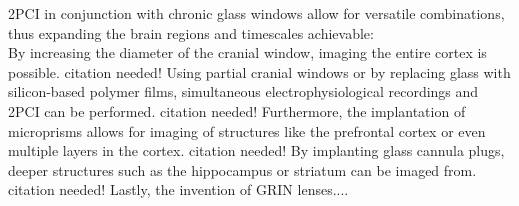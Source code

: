 2PCI in conjunction with chronic glass windows allow for versatile combinations, thus expanding the brain regions and timescales achievable:\\
By increasing the diameter of the cranial window, imaging the entire cortex is possible. citation needed! Using partial cranial windows or by replacing glass with silicon-based polymer films, simultaneous electrophysiological recordings and 2PCI can be performed. citation needed! Furthermore, the implantation of microprisms allows for imaging of structures like the prefrontal cortex or even multiple layers in the cortex. citation needed! By implanting glass cannula plugs, deeper structures such as the hippocampus or striatum can be imaged from. citation needed! Lastly, the invention of GRIN lenses....
